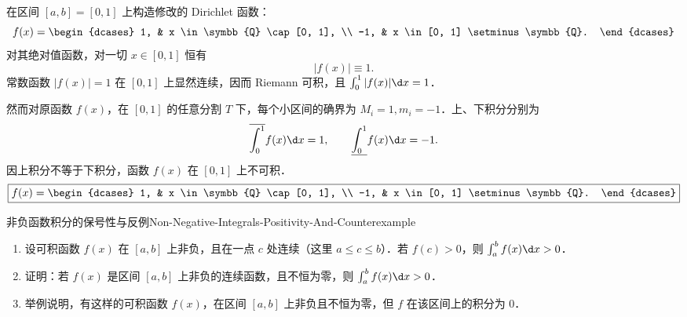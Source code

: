 \begin{solution}
    在区间 $[a, b] = [0, 1]$ 上构造修改的 Dirichlet 函数：
    \begin{equation}
        f(x) = \begin{dcases} 1, & x \in \symbb{Q} \cap [0, 1], \\ -1, & x \in [0, 1] \setminus \symbb{Q}. \end{dcases}
    \end{equation}
    对其绝对值函数，对一切 $x \in [0, 1]$ 恒有
    \begin{equation}
        |f(x)| \equiv 1.
    \end{equation}
    常数函数 $|f(x)| = 1$ 在 $[0, 1]$ 上显然连续，因而 Riemann 可积，且 $\int_0^1 |f(x)| \d x = 1$．

    然而对原函数 $f(x)$，在 $[0, 1]$ 的任意分割 $T$ 下，每个小区间的确界为 $M_i = 1, m_i = -1$．上、下积分分别为
    \begin{equation}
        \overline{\int_0^1} f(x) \d x = 1, \qquad \underline{\int_0^1} f(x) \d x = -1.
    \end{equation}
    因上积分不等于下积分，函数 $f(x)$ 在 $[0, 1]$ 上不可积．
    \begin{equation}
        \boxed{f(x) = \begin{dcases} 1, & x \in \symbb{Q} \cap [0, 1], \\ -1, & x \in [0, 1] \setminus \symbb{Q}. \end{dcases}}
    \end{equation}
\end{solution}

\begin{problem}{非负函数积分的保号性与反例}{Non-Negative-Integrals-Positivity-And-Counterexample}
    \begin{enumerate}
        \item 设可积函数 $f(x)$ 在 $[a, b]$ 上非负，且在一点 $c$ 处连续（这里 $a \leqslant c \leqslant b$）．若 $f(c) > 0$，则 $\int_a^b f(x) \d x > 0$．
        \item 证明：若 $f(x)$ 是区间 $[a, b]$ 上非负的连续函数，且不恒为零，则 $\int_a^b f(x) \d x > 0$．
        \item 举例说明，有这样的可积函数 $f(x)$，在区间 $[a, b]$ 上非负且不恒为零，但 $f$ 在该区间上的积分为 $0$．
    \end{enumerate}
\end{problem}

